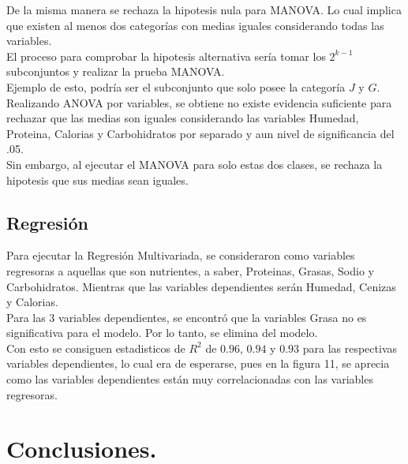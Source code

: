 \documentclass[12pt, letterpaper]{article}
\begin{document}
De la misma manera se rechaza la hipotesis nula para MANOVA. Lo cual implica que existen al menos dos categorías con medias iguales considerando todas las variables.\\

El proceso para comprobar la hipotesis alternativa sería tomar los $2^{k-1}$ subconjuntos y realizar la prueba MANOVA.\\

Ejemplo de esto, podría ser el subconjunto que solo posee la categoría $J$ y $G$. Realizando ANOVA por variables, se obtiene no existe evidencia suficiente para rechazar que las medias son iguales considerando las variables Humedad, Proteina, Calorias y Carbohidratos por separado y aun nivel de significancia del .05.\\

Sin embargo, al ejecutar el MANOVA para solo estas dos clases, se rechaza la hipotesis que sus medias sean iguales.

\subsection{Regresión}
Para ejecutar la Regresión Multivariada, se consideraron como variables regresoras a aquellas que son nutrientes, a saber, Proteinas, Grasas, Sodio y Carbohidratos. Mientras que las variables dependientes serán Humedad, Cenizas y Calorias.\\

Para las 3 variables dependientes, se encontró que la variables Grasa no es significativa para el modelo. Por lo tanto, se elimina del modelo.\\

Con esto se consiguen estadisticos de $R^2$ de $0.96$, $0.94$ y $0.93$ para las respectivas variables dependientes, lo cual era de esperarse, pues en la figura 11, se aprecia como las variables dependientes están muy correlacionadas con las variables regresoras.

\section{Conclusiones.}
\end{document}
